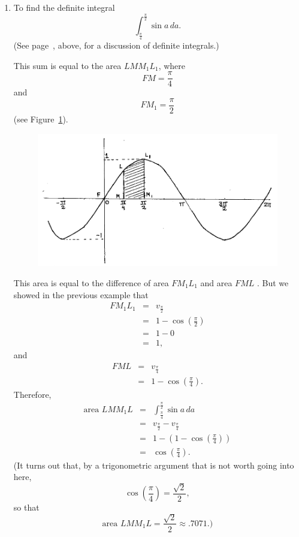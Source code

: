\documentclass[polutonikogreek,english,twoside,openright]{article}
\newlength{\oldjot}
\begin{document}
\begin{enumerate}
\item To find the definite integral 
$$\int_\frac{\pi}{4}^\frac{\pi}{2}\!\sin a\,da.$$
(See page~\pageref{defint}, above, for a discussion of definite integrals.)

 This sum is equal to the area $LMM_1L_1$, where 
$$FM = \frac{\pi}{4}$$
 and 
 $$FM_1 = \frac{\pi}{2}$$
 (see Figure~\ref{defsinsum}).
 \begin{figure}[htp]
\begin{center}
\includegraphics[width=\textwidth]{fig/Figure50}
\caption{}
\label{defsinsum}
\vspace{-10pt}
\end{center}
\end{figure}  This area is equal to the difference of area $FM_1L_1$ and area $FML$ .  But we showed in the previous example that 
\begin{eqnarray*}
FM_1L_1 & = & v_\frac{\pi}{2}\\
 & = & 1 - \cos\left(\frac{\pi}{2}\right)\\ 
 & = & 1 - 0\\
 & = & 1,
 \end{eqnarray*}
 and
 \begin{eqnarray*}
FML & = & v_\frac{\pi}{4}\\
 & = & 1 - \cos\left(\frac{\pi}{4}\right).
  \end{eqnarray*}
 Therefore,
\begin{eqnarray*}
\mbox{area }LMM_1L & = & \int_\frac{\pi}{4}^\frac{\pi}{2}\!\sin a\,da \\
& = & v_\frac{\pi}{2} - v_\frac{\pi}{4}\\
& = & 1 - \left(1 - \cos\left(\frac{\pi}{4}\right)\right)\\
& = & \cos\left(\frac{\pi}{4}\right).
\end{eqnarray*}
\setlength{\jot}{\oldjot}
\hspace{-.4em}(It turns out that, by a trigonometric argument that is not worth going into here,
 $$\cos\left(\frac{\pi}{4}\right) = \frac{\sqrt{2}}{2},$$
 so that 
 $$\mbox{area }LMM_1L = \frac{\sqrt{2}}{2} \approx  .7071.)$$

\end{enumerate}
\end{document}
